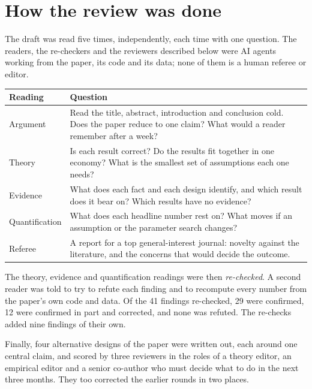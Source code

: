 
\section{How the review was done}\label{sec:method}

The draft was read five times, independently, each time with one question. The readers, the re-checkers and the reviewers described below were AI agents working from the paper, its code and its data; none of them is a human referee or editor.

\begin{center}\small
\begin{tabularx}{\textwidth}{@{}P{1.1in}L@{}}
\toprule
Reading & Question \\
\midrule
Argument & Read the title, abstract, introduction and conclusion cold. Does the paper reduce to one claim? What would a reader remember after a week? \\
Theory & Is each result correct? Do the results fit together in one economy? What is the smallest set of assumptions each one needs? \\
Evidence & What does each fact and each design identify, and which result does it bear on? Which results have no evidence? \\
Quantification & What does each headline number rest on? What moves if an assumption or the parameter search changes? \\
Referee & A report for a top general-interest journal: novelty against the literature, and the concerns that would decide the outcome. \\
\bottomrule
\end{tabularx}
\end{center}

The theory, evidence and quantification readings were then \emph{re-checked}. A second reader was told to try to refute each finding and to recompute every number from the paper's own code and data. Of the 41 findings re-checked, 29 were confirmed, 12 were confirmed in part and corrected, and none was refuted. The re-checks added nine findings of their own.

Finally, four alternative designs of the paper were written out, each around one central claim, and scored by three reviewers in the roles of a theory editor, an empirical editor and a senior co-author who must decide what to do in the next three months. They too corrected the earlier rounds in two places.

